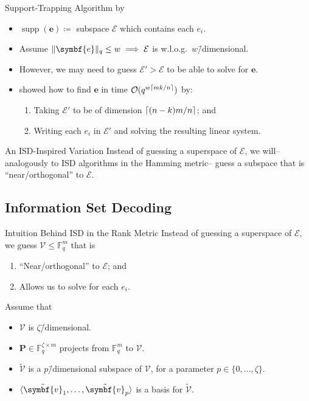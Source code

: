 \documentclass[usepdftitle=false]{beamer}
\renewcommand*{\vec}{\symbf}%
\newcommand*{\mat}{\symbf}%
\DeclareMathOperator{\supp}{supp}%
\DeclarePairedDelimiter{\basis}{\langle}{\rangle}%
\newcommand*{\FF}{\ensuremath{\mathbb{F}}}%
\newcommand*{\BigOh}{\mathcal{O}}%
\DeclarePairedDelimiter{\ceil}{\lceil}{\rceil}%
\DeclarePairedDelimiter{\norm}{\lVert}{\rVert}%
\newcommand*{\normR}[2]{\ensuremath{\norm{#1}_{#2}}}%
\begin{document}
\begin{frame}{Support-Trapping Algorithm by \textcite{GRS13}}
  \begin{itemize}
  \item \(\supp(\vec{e}) \coloneqq\) subspace \(\mathcal{E}\) which
    contains each \(e_i\).
  \item Assume \(\normR{\vec{e}}{q} \le w \implies \mathcal{E}\) is
    w.l.o.g.\ \(w\)\=/dimensional.
  \item However, we may need to guess \(\mathcal{E}' > \mathcal{E}\)
    to be able to solve for \(\vec{e}\).
  \item \Textcite{GRS13} showed how to find \(\vec{e}\) in time
    \(\BigOh(q^{w \ceil{m k / {n}}})\) by:
    \begin{enumerate}
    \item Taking \(\mathcal{E}'\) to be of dimension
      \(\ceil{(n - k) m / {n}}\); and
    \item Writing each \(e_i\) in \(\mathcal{E}'\) and solving the
      resulting linear system.
    \end{enumerate}
  \end{itemize}
  \begin{alertblock}{An ISD-Inspired Variation}
    Instead of guessing a superspace of \(\mathcal{E}\), we will\---
    analogously to ISD algorithms in the Hamming metric\--- guess a
    subspace that is \enquote{near\-/orthogonal} to \(\mathcal{E}\).
  \end{alertblock}
\end{frame}

\subsection{Information Set Decoding}

\begin{frame}{Intuition Behind ISD in the Rank Metric}
  Instead of guessing a superspace of \(\mathcal{E}\), we guess
  \(\mathcal{V} \le \FF_q^m\) that is
  \begin{enumerate}
  \item \enquote{Near\-/orthogonal} to \(\mathcal{E}\); and
  \item Allows us to solve for each \(e_i\).
  \end{enumerate}
  Assume that
  \begin{itemize}
  \item \(\mathcal{V}\) is \(\zeta\)\=/dimensional.
  \item \(\mat{P} \in \FF_q^{\zeta \times m}\) projects from
    \(\FF_q^m\) to \(\mathcal{V}\).
  \item \(\tilde{\mathcal{V}}\) is a \(p\)\=/dimensional subspace of
    \(\mathcal{V}\), for a parameter \(p \in \{0, \ldots, \zeta\}\).
  \item \(\basis{\tilde{\vec{v}}_1, \ldots, \tilde{\vec{v}}_p}\) is a
    basis for \(\tilde{\mathcal{V}}\).
  \end{itemize}
\end{frame}
\end{document}

